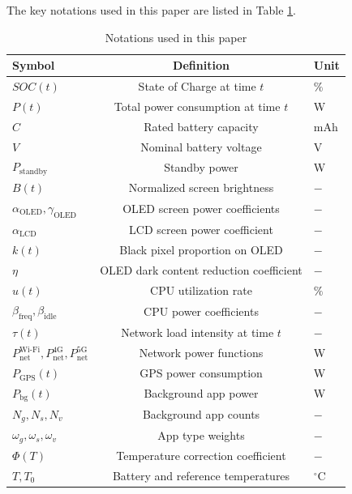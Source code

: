 \documentclass{mcmthesis}  %
\begin{document}
	The key notations used in this paper are listed in Table \ref{tab:notations}.
	\begin{table}[h!]
		\centering
		\vspace{-7pt}
		\caption{Notations used in this paper}
		\label{tab:notations}
		\renewcommand{\arraystretch}{1.2} 
		\begin{tabular}{lcl}
			\toprule
			\textbf{Symbol} & \textbf{Definition} & \textbf{Unit} \\
			\midrule
			\rowcolor{LightGreen}
			$SOC(t)$ & State of Charge at time $t$ & $\%$ \\
			$P(t)$ & Total power consumption at time $t$ & W \\
			\rowcolor{LightGreen}
			$C$ & Rated battery capacity & mAh \\
			$V$ & Nominal battery voltage & V \\
			\rowcolor{LightGreen}
			$P_{\text{standby}}$ & Standby power & W \\
			$B(t)$ & Normalized screen brightness & $-$ \\
			\rowcolor{LightGreen}
			$\alpha_{\text{OLED}}, \gamma_{\text{OLED}}$ & OLED screen power coefficients & $-$ \\
			$\alpha_{\text{LCD}}$ & LCD screen power coefficient & $-$ \\
			\rowcolor{LightGreen}
			$k(t)$ & Black pixel proportion on OLED & $-$ \\
			$\eta$ & OLED dark content reduction coefficient & $-$ \\
			\rowcolor{LightGreen}
			$u(t)$ & CPU utilization rate & $\%$ \\
			$\beta_{\text{freq}}, \beta_{\text{idle}}$ & CPU power coefficients & $-$ \\
			\rowcolor{LightGreen}
			$\tau(t)$ & Network load intensity at time $t$ & $-$ \\
			$P_{\text{net}}^{\text{Wi-Fi}}, P_{\text{net}}^{4\text{G}}, P_{\text{net}}^{5\text{G}}$ & Network power functions & W \\
			\rowcolor{LightGreen}
			$P_{\text{GPS}}(t)$ & GPS power consumption & W \\
			$P_{\text{bg}}(t)$ & Background app power & W \\
			\rowcolor{LightGreen}
			$N_g, N_s, N_v$ & Background app counts & $-$ \\
			$\omega_g, \omega_s, \omega_v$ & App type weights & $-$ \\
			\rowcolor{LightGreen}
			$\Phi(T)$ & Temperature correction coefficient & $-$ \\
			$T, T_0$ & Battery and reference temperatures & $^\circ$C \\
			\bottomrule
		\end{tabular}
	\end{table}
	
\end{document}
